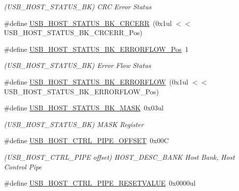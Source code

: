 \begin{DoxyCompactItemize}
\begin{DoxyCompactList}\small\item\em (U\+S\+B\+\_\+\+H\+O\+S\+T\+\_\+\+S\+T\+A\+T\+U\+S\+\_\+\+BK) C\+RC Error Status \end{DoxyCompactList}\item 
\#define \mbox{\hyperlink{group___s_a_m_d21___u_s_b_ga4f15cbfc62ec3a588ca6a260dd42d249}{U\+S\+B\+\_\+\+H\+O\+S\+T\+\_\+\+S\+T\+A\+T\+U\+S\+\_\+\+B\+K\+\_\+\+C\+R\+C\+E\+RR}}~(0x1ul $<$$<$ U\+S\+B\+\_\+\+H\+O\+S\+T\+\_\+\+S\+T\+A\+T\+U\+S\+\_\+\+B\+K\+\_\+\+C\+R\+C\+E\+R\+R\+\_\+\+Pos)
\item 
\#define \mbox{\hyperlink{group___s_a_m_d21___u_s_b_ga561f968ef18f6f772cbffe1a4d8c49a7}{U\+S\+B\+\_\+\+H\+O\+S\+T\+\_\+\+S\+T\+A\+T\+U\+S\+\_\+\+B\+K\+\_\+\+E\+R\+R\+O\+R\+F\+L\+O\+W\+\_\+\+Pos}}~1
\begin{DoxyCompactList}\small\item\em (U\+S\+B\+\_\+\+H\+O\+S\+T\+\_\+\+S\+T\+A\+T\+U\+S\+\_\+\+BK) Error Flow Status \end{DoxyCompactList}\item 
\#define \mbox{\hyperlink{group___s_a_m_d21___u_s_b_ga55212f889dacd0bef5af2149aff1a368}{U\+S\+B\+\_\+\+H\+O\+S\+T\+\_\+\+S\+T\+A\+T\+U\+S\+\_\+\+B\+K\+\_\+\+E\+R\+R\+O\+R\+F\+L\+OW}}~(0x1ul $<$$<$ U\+S\+B\+\_\+\+H\+O\+S\+T\+\_\+\+S\+T\+A\+T\+U\+S\+\_\+\+B\+K\+\_\+\+E\+R\+R\+O\+R\+F\+L\+O\+W\+\_\+\+Pos)
\item 
\#define \mbox{\hyperlink{group___s_a_m_d21___u_s_b_ga2cbf893bf5b3ddc9f8f5017de44b76d1}{U\+S\+B\+\_\+\+H\+O\+S\+T\+\_\+\+S\+T\+A\+T\+U\+S\+\_\+\+B\+K\+\_\+\+M\+A\+SK}}~0x03ul
\begin{DoxyCompactList}\small\item\em (U\+S\+B\+\_\+\+H\+O\+S\+T\+\_\+\+S\+T\+A\+T\+U\+S\+\_\+\+BK) M\+A\+SK Register \end{DoxyCompactList}\item 
\#define \mbox{\hyperlink{group___s_a_m_d21___u_s_b_ga699b7627c69a2e077849a7482d2d0c0e}{U\+S\+B\+\_\+\+H\+O\+S\+T\+\_\+\+C\+T\+R\+L\+\_\+\+P\+I\+P\+E\+\_\+\+O\+F\+F\+S\+ET}}~0x00C
\begin{DoxyCompactList}\small\item\em (U\+S\+B\+\_\+\+H\+O\+S\+T\+\_\+\+C\+T\+R\+L\+\_\+\+P\+I\+PE offset) H\+O\+S\+T\+\_\+\+D\+E\+S\+C\+\_\+\+B\+A\+NK Host Bank, Host Control Pipe \end{DoxyCompactList}\item 
\#define \mbox{\hyperlink{group___s_a_m_d21___u_s_b_ga7756bd851dfff7295baaab22792506e6}{U\+S\+B\+\_\+\+H\+O\+S\+T\+\_\+\+C\+T\+R\+L\+\_\+\+P\+I\+P\+E\+\_\+\+R\+E\+S\+E\+T\+V\+A\+L\+UE}}~0x0000ul

\end{DoxyCompactItemize}
